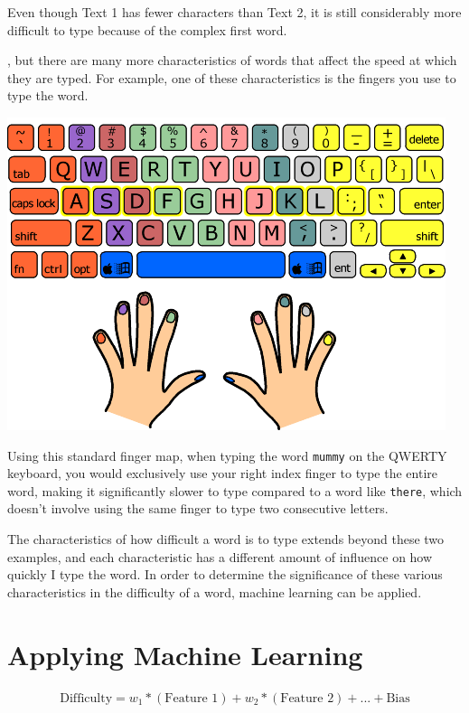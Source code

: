\documentclass[12pt]{article}
\newenvironment{textexamples}
  {\medskip\par\setlength{\parindent}{0pt}}
  {\par\medskip}
\begin{document}
Even though Text 1 has fewer characters than Text 2, it is still considerably more difficult to type because of the complex first word.

, but there are many more characteristics of words that affect the speed at which they are typed. For example, one of these characteristics is the fingers you use to type the word.

\includegraphics{finger-map.png}

Using this standard finger map, when typing the word \texttt{mummy} on the QWERTY keyboard, you would exclusively use your right index finger to type the entire word, making it significantly slower to type compared to a word like \texttt{there}, which doesn't involve using the same finger to type two consecutive letters.

\begin{textexamples}
\end{textexamples}

The characteristics of how difficult a word is to type extends beyond these two examples, and each characteristic has a different amount of influence on how quickly I type the word. In order to determine the significance of these various characteristics in the difficulty of a word, machine learning can be applied.

\section*{Applying Machine Learning}

\begin{align*}
\text{Difficulty} = w_1 * (\text{Feature 1}) + w_2 * (\text{Feature 2}) + ... + \text{Bias}
\end{align*}
\end{document}
